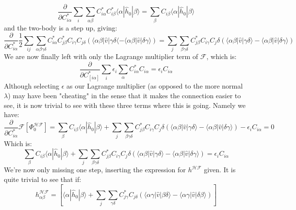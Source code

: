 \documentclass{article}
\begin{document}
\begin{equation*}
    \frac{\partial}{\partial C_{i \alpha}^*} \sum_i \sum_{\alpha \beta} C_{i\alpha}^* C_{i \beta}^* \langle \alpha | \hat h_0 | \beta \rangle = \sum_\beta C_{i\beta} \langle \alpha | \hat h_0 | \beta \rangle
\end{equation*}
and the two-body is a step up, giving:
\begin{equation*}
    \frac{\partial}{\partial C_{i \alpha}^*}\frac{1}{2} \sum_{ij}\sum_{\alpha \beta \gamma \delta}C_{i\alpha}^* C_{j\beta}^* C_{i\gamma} C_{j\delta} \left(\langle \alpha \beta | \hat v | \gamma \delta \langle - \langle \alpha \beta | \hat v | \delta \gamma \rangle \right) = \sum_j \sum_{\beta \gamma \delta} C_{j \beta}^* C_{i\gamma} C_j{\delta} \left(\langle \alpha \beta | \hat v | \gamma \delta \rangle - \langle \alpha \beta | \hat v | \delta \gamma \rangle \right)
\end{equation*}
We are now finally left with only the Lagrange multiplier term of $\mathcal{F}$, which is:
\begin{equation*}
    \frac{\partial}{\partial C_[i \alpha]^*} \sum_i \epsilon_i \sum_\alpha C_{i\alpha}^* C_{i \alpha} = \epsilon_i C_{i \alpha}
\end{equation*}
Although selecting $\epsilon$ as our Lagrange multiplier (as opposed to the more normal $\lambda$) may have been "cheating" in the sense that it makes the connection easier to see, it is now trivial to see with these three terms where this is going. Namely we have:
\begin{equation}
    \frac{\partial}{\partial C_{i \alpha}^*} \mathcal{F}[\Phi_0^{\mathcal{H}\mathcal{F}}] = \sum_\beta C_{i\beta} \langle \alpha | \hat h_0 | \beta \rangle + \sum_j \sum_{\beta \gamma \delta} C_{j \beta}^* C_{i\gamma} C_j{\delta} \left(\langle \alpha \beta | \hat v | \gamma \delta \rangle - \langle \alpha \beta | \hat v | \delta \gamma \rangle \right) - \epsilon_i C_{i \alpha} = 0
\end{equation}
Which is:
\begin{equation*}
    \sum_\beta C_{i\beta} \langle \alpha | \hat h_0 | \beta \rangle + \sum_j \sum_{\beta \gamma \delta} C_{j \beta}^* C_{i\gamma} C_j{\delta} \left(\langle \alpha \beta | \hat v | \gamma \delta \rangle - \langle \alpha \beta | \hat v | \delta \gamma \rangle \right) = \epsilon_i C_{i \alpha}
\end{equation*}
We're now only missing one step, inserting the expression for $h^{\mathcal{H}\mathcal{F}}$ given. It is quite trivial to see that if:
\begin{equation*}
    h_{\alpha\beta}^{\mathcal{H}\mathcal{F}} = \left[\langle \alpha| \hat h_0 | \beta \rangle + \sum_j \sum_{\gamma \delta} C_{j\gamma}^* C_{j\delta} \left( \langle \alpha \gamma | \hat v | \beta \delta \rangle - \langle \alpha \gamma | \hat v | \delta \beta \rangle \right) \right]
\end{equation*}
\end{document}
